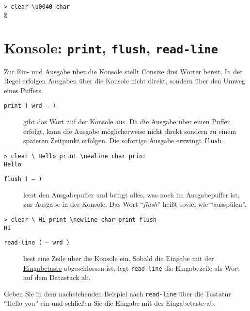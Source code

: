 \begin{verbatim}
> clear \u0040 char
@
\end{verbatim}

\section{Konsole: \texttt{print}, \texttt{flush}, \texttt{read-}\-\texttt{line}}

Zur Ein- und Ausgabe über die Konsole stellt Consize drei Wörter bereit. In der Regel erfolgen Ausgaben über die Konsole nicht direkt, sondern über den Umweg eines Puffers.

\begin{description}
\item[\texttt{print ( wrd -- )}] gibt das Wort auf der Konsole aus. Da die Ausgabe über einen \href{http://de.wikipedia.org/wiki/Puffer\_(Informatik)}{Puffer} erfolgt, kann die Ausgabe möglicherweise nicht direkt sondern zu einem späteren Zeitpunkt erfolgen. Die sofortige Ausgabe erzwingt \verb|flush|. 
\end{description}

\begin{verbatim}
> clear \ Hello print \newline char print
Hello

\end{verbatim}

\begin{description}
\item[\texttt{flush ( -- )}] leert den Ausgabepuffer und bringt alles, was noch im Ausgabepuffer ist, zur Ausgabe in der Konsole. Das Wort "`\emph{flush}"' heißt soviel wie "`ausspülen"'.
\end{description}

\begin{verbatim}
> clear \ Hi print \newline char print flush
Hi

\end{verbatim}

\begin{description}
\item[\texttt{read-line ( -- wrd )}] liest eine Zeile über die Konsole ein. Sobald die Eingabe mit der \href{http://de.wikipedia.org/wiki/Eingabetaste}{Eingabetaste} abgeschlossen ist, legt \verb|read-line| die Eingabezeile als Wort auf dem Datastack ab.
\end{description}

Geben Sie in dem nachstehenden Beispiel nach \verb|read-line| über die Tastatur "`Hello you"' ein und schließen Sie die Eingabe mit der Eingabetaste ab.

